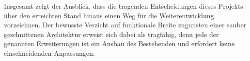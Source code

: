 Insgesamt zeigt der Ausblick, dass die tragenden Entscheidungen dieses Projekts über den erreichten Stand hinaus einen Weg für die Weiterentwicklung vorzeichnen. Der bewusste Verzicht auf funktionale Breite zugunsten einer sauber geschnittenen Architektur erweist sich dabei als tragfähig, denn jede der genannten Erweiterungen ist ein Ausbau des Bestehenden und erfordert keine einschneidenden Anpassungen.
